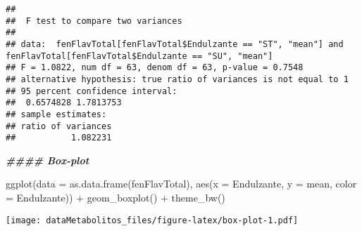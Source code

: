 \documentclass[
]{article}
\newenvironment{Shaded}{\begin{snugshade}}{\end{snugshade}}
\newcommand{\AttributeTok}[1]{\textcolor[rgb]{0.77,0.63,0.00}{#1}}
\newcommand{\DocumentationTok}[1]{\textcolor[rgb]{0.56,0.35,0.01}{\textbf{\textit{#1}}}}
\newcommand{\FunctionTok}[1]{\textcolor[rgb]{0.00,0.00,0.00}{#1}}
\newcommand{\NormalTok}[1]{#1}
\newcommand{\SpecialCharTok}[1]{\textcolor[rgb]{0.00,0.00,0.00}{#1}}
\newcommand{\StringTok}[1]{\textcolor[rgb]{0.31,0.60,0.02}{#1}}
\begin{document}
\begin{Shaded}
\end{Shaded}

\begin{verbatim}
## 
##  F test to compare two variances
## 
## data:  fenFlavTotal[fenFlavTotal$Endulzante == "ST", "mean"] and fenFlavTotal[fenFlavTotal$Endulzante == "SU", "mean"]
## F = 1.0822, num df = 63, denom df = 63, p-value = 0.7548
## alternative hypothesis: true ratio of variances is not equal to 1
## 95 percent confidence interval:
##  0.6574828 1.7813753
## sample estimates:
## ratio of variances 
##           1.082231
\end{verbatim}

\begin{Shaded}
\begin{Highlighting}[]
\DocumentationTok{\#\#\#\# Box{-}plot}
\end{Highlighting}
\end{Shaded}

\begin{Shaded}
\begin{Highlighting}[]
\FunctionTok{ggplot}\NormalTok{(}\AttributeTok{data =} \FunctionTok{as.data.frame}\NormalTok{(fenFlavTotal), }\FunctionTok{aes}\NormalTok{(}\AttributeTok{x =}\NormalTok{ Endulzante, }\AttributeTok{y =}\NormalTok{ mean, }\AttributeTok{color =}\NormalTok{ Endulzante)) }\SpecialCharTok{+}
  \FunctionTok{geom\_boxplot}\NormalTok{() }\SpecialCharTok{+}
  \FunctionTok{theme\_bw}\NormalTok{()}
\end{Highlighting}
\end{Shaded}

\texttt{[image: dataMetabolitos\_files/figure-latex/box-plot-1.pdf]}
\end{document}
